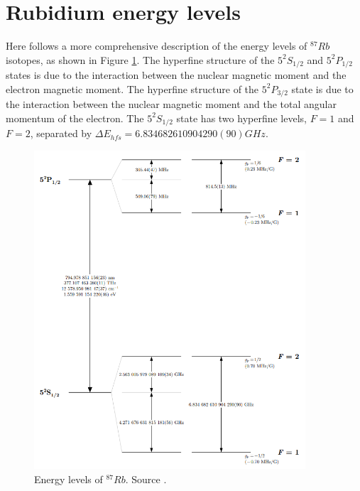 \pagebreak
\section*{Rubidium energy levels}
\label{appendix:Rubidium-energy-levels}

Here follows a more comprehensive description of the energy levels of $^{87}Rb$ isotopes, as shown in Figure \ref{fig:Rubidium-energy-levels}.
The hyperfine structure of the $5^2S_{1/2}$ and $5^2P_{1/2}$ states is due to the interaction between the nuclear magnetic moment and the electron magnetic moment.
The hyperfine structure of the $5^2P_{3/2}$ state is due to the interaction between the nuclear magnetic moment and the total angular momentum of the electron.
The $5^2S_{1/2}$ state has two hyperfine levels, $F=1$ and $F=2$, separated by $\Delta E_{hfs} = 6.834682610904290(90) GHz$.

\begin{figure}[H]
    \centering
    \includegraphics[width=0.9\textwidth, max width=\linewidth]{img/levels-Rubidium.png}
    \caption{Energy levels of $^{87}Rb$. Source \cite{ALKALINI}.}
    \label{fig:Rubidium-energy-levels}
\end{figure}

